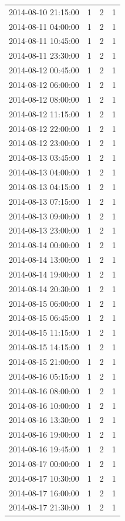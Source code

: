 \begin{tabular}{lrrr}
2014-08-10 21:15:00 & 1 & 2 & 1 \\
2014-08-11 04:00:00 & 1 & 2 & 1 \\
2014-08-11 10:45:00 & 1 & 2 & 1 \\
2014-08-11 23:30:00 & 1 & 2 & 1 \\
2014-08-12 00:45:00 & 1 & 2 & 1 \\
2014-08-12 06:00:00 & 1 & 2 & 1 \\
2014-08-12 08:00:00 & 1 & 2 & 1 \\
2014-08-12 11:15:00 & 1 & 2 & 1 \\
2014-08-12 22:00:00 & 1 & 2 & 1 \\
2014-08-12 23:00:00 & 1 & 2 & 1 \\
2014-08-13 03:45:00 & 1 & 2 & 1 \\
2014-08-13 04:00:00 & 1 & 2 & 1 \\
2014-08-13 04:15:00 & 1 & 2 & 1 \\
2014-08-13 07:15:00 & 1 & 2 & 1 \\
2014-08-13 09:00:00 & 1 & 2 & 1 \\
2014-08-13 23:00:00 & 1 & 2 & 1 \\
2014-08-14 00:00:00 & 1 & 2 & 1 \\
2014-08-14 13:00:00 & 1 & 2 & 1 \\
2014-08-14 19:00:00 & 1 & 2 & 1 \\
2014-08-14 20:30:00 & 1 & 2 & 1 \\
2014-08-15 06:00:00 & 1 & 2 & 1 \\
2014-08-15 06:45:00 & 1 & 2 & 1 \\
2014-08-15 11:15:00 & 1 & 2 & 1 \\
2014-08-15 14:15:00 & 1 & 2 & 1 \\
2014-08-15 21:00:00 & 1 & 2 & 1 \\
2014-08-16 05:15:00 & 1 & 2 & 1 \\
2014-08-16 08:00:00 & 1 & 2 & 1 \\
2014-08-16 10:00:00 & 1 & 2 & 1 \\
2014-08-16 13:30:00 & 1 & 2 & 1 \\
2014-08-16 19:00:00 & 1 & 2 & 1 \\
2014-08-16 19:45:00 & 1 & 2 & 1 \\
2014-08-17 00:00:00 & 1 & 2 & 1 \\
2014-08-17 10:30:00 & 1 & 2 & 1 \\
2014-08-17 16:00:00 & 1 & 2 & 1 \\
2014-08-17 21:30:00 & 1 & 2 & 1 \\

\end{tabular}
